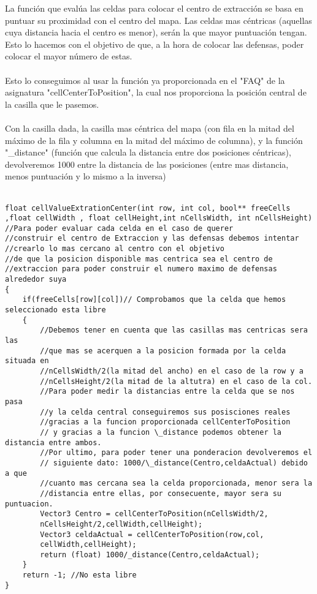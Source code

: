 La función que evalúa las celdas para colocar el centro de extracción se basa en puntuar su proximidad con el centro del mapa. Las celdas mas céntricas (aquellas cuya distancia hacia el centro es menor), serán la que mayor puntuación tengan. Esto lo hacemos con el objetivo de que, a la hora de colocar las defensas, poder colocar el mayor número de estas. \\\\
Esto lo conseguimos al usar la función ya proporcionada en el "FAQ" de la asignatura "cellCenterToPosition", la cual nos proporciona la posición central de la casilla que le pasemos. \\\\
Con la casilla dada, la casilla mas céntrica del mapa (con fila en la mitad del máximo de la fila y columna en la mitad del máximo de columna), y la función "\_distance" (función que calcula la distancia entre dos posiciones céntricas), devolveremos 1000 entre la distancia de las posiciones (entre mas distancia, menos puntuación y lo mismo a la inversa)\\\\

\begin{lstlisting}[frame=single,basicstyle=\tiny,title={Funcion cellValueExtrationCenter}]
float cellValueExtrationCenter(int row, int col, bool** freeCells
,float cellWidth , float cellHeight,int nCellsWidth, int nCellsHeight)
//Para poder evaluar cada celda en el caso de querer 
//construir el centro de Extraccion y las defensas debemos intentar
//crearlo lo mas cercano al centro con el objetivo 
//de que la posicion disponible mas centrica sea el centro de 
//extraccion para poder construir el numero maximo de defensas alrededor suya
{
	if(freeCells[row][col])// Comprobamos que la celda que hemos seleccionado esta libre
	{
		//Debemos tener en cuenta que las casillas mas centricas sera las 
		//que mas se acerquen a la posicion formada por la celda situada en
		//nCellsWidth/2(la mitad del ancho) en el caso de la row y a 
		//nCellsHeight/2(la mitad de la altutra) en el caso de la col.
		//Para poder medir la distancias entre la celda que se nos pasa 
		//y la celda central conseguiremos sus posisciones reales
		//gracias a la funcion proporcionada cellCenterToPosition
		// y gracias a la funcion \_distance podemos obtener la distancia entre ambos.
		//Por ultimo, para poder tener una ponderacion devolveremos el
		// siguiente dato: 1000/\_distance(Centro,celdaActual) debido a que
		//cuanto mas cercana sea la celda proporcionada, menor sera la 
		//distancia entre ellas, por consecuente, mayor sera su puntuacion.
		Vector3 Centro = cellCenterToPosition(nCellsWidth/2,
		nCellsHeight/2,cellWidth,cellHeight);
		Vector3 celdaActual = cellCenterToPosition(row,col,
		cellWidth,cellHeight);
		return (float) 1000/_distance(Centro,celdaActual);
	}
	return -1; //No esta libre
}
\end{lstlisting}
